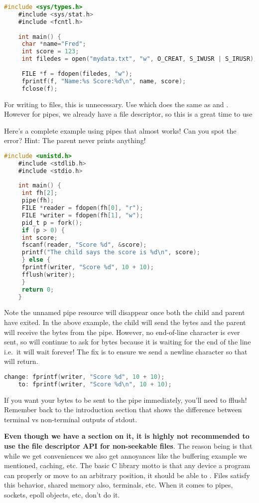 \begin{lstlisting}[language=C]
	#include <sys/types.h>
	#include <sys/stat.h>
	#include <fcntl.h>
	 
	int main() {
	 char *name="Fred";
	 int score = 123;
	 int filedes = open("mydata.txt", "w", O_CREAT, S_IWUSR | S_IRUSR);
	 
	 FILE *f = fdopen(filedes, "w");
	 fprintf(f, "Name:%s Score:%d\n", name, score);
	 fclose(f);
\end{lstlisting}
	 
For writing to files, this is unnecessary.
Use  which does the same as  and .
However for pipes, we already have a file descriptor, so this is a great time to use 
	 
Here's a complete example using pipes that almost works!
Can you spot the error?
Hint: The parent never prints anything!
	 
\begin{lstlisting}[language=C]
	#include <unistd.h>
	#include <stdlib.h>
	#include <stdio.h>
	 
	int main() {
	 int fh[2];
	 pipe(fh);
	 FILE *reader = fdopen(fh[0], "r");
	 FILE *writer = fdopen(fh[1], "w");
	 pid_t p = fork();
	 if (p > 0) {
	 int score;
	 fscanf(reader, "Score %d", &score);
	 printf("The child says the score is %d\n", score);
	 } else {
	 fprintf(writer, "Score %d", 10 + 10);
	 fflush(writer);
	 }
	 return 0;
	}
\end{lstlisting}
	 
Note the unnamed pipe resource will disappear once both the child and parent have exited.
In the above example, the child will send the bytes and the parent will receive the bytes from the pipe.
However, no end-of-line character is ever sent, so  will continue to ask for bytes because it is waiting for the end of the line i.e.~it will wait forever! The fix is to ensure we send a newline character so that  will return.
	 
\begin{lstlisting}[language=C]
	change: fprintf(writer, "Score %d", 10 + 10);
	to: fprintf(writer, "Score %d\n", 10 + 10);
\end{lstlisting}
	 
If you want your bytes to be sent to the pipe immediately, you'll need to fflush!
Remember back to the introduction section that shows the difference between terminal vs non-terminal outputs of stdout.
	 
\textbf{Even though we have a section on it, it is highly not recommended to use the file descriptor API for non-seekable files}.
The reason being is that while we get conveniences we also get annoyances like the buffering example we mentioned, caching, etc.
The basic C library motto is that any device a program can properly  or move to an arbitrary position, it should be able to .
Files satisfy this behavior, shared memory also, terminals, etc.
When it comes to pipes, sockets, epoll objects, etc, don't do it.
	 
